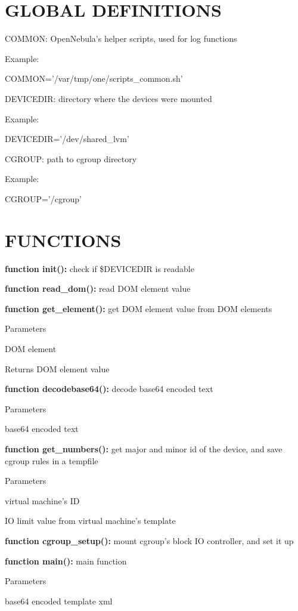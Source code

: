\hypertarget{doc_def}{}\section{GLOBAL DEFINITIONS}\label{doc_def}
COMMON: OpenNebula's helper scripts, used for log functions \par


Example: \par
 
\begin{DoxyCode}
 COMMON='/var/tmp/one/scripts_common.sh'
\end{DoxyCode}
 DEVICEDIR: directory where the devices were mounted \par


Example: \par
 
\begin{DoxyCode}
 DEVICEDIR='/dev/shared_lvm'
\end{DoxyCode}
 CGROUP: path to cgroup directory \par


Example: \par
 
\begin{DoxyCode}
 CGROUP='/cgroup'
\end{DoxyCode}
\hypertarget{doc_func}{}\section{FUNCTIONS}\label{doc_func}
{\bfseries function init():} check if \$DEVICEDIR is readable \par


{\bfseries function read\_\-dom():} read DOM element value \par


{\bfseries function get\_\-element():} get DOM element value from DOM elements 
\begin{DoxyParams}{Parameters}
\item[\mbox{\tt[in]} {\em entity}]DOM element \end{DoxyParams}
\begin{DoxyReturn}{Returns}
DOM element value
\end{DoxyReturn}
{\bfseries function decodebase64():} decode base64 encoded text 
\begin{DoxyParams}{Parameters}
\item[\mbox{\tt[in]} {\em text}]base64 encoded text\end{DoxyParams}
{\bfseries function get\_\-numbers():} get major and minor id of the device, and save cgroup rules in a tempfile 
\begin{DoxyParams}{Parameters}
\item[\mbox{\tt[in]} {\em id}]virtual machine's ID \item[\mbox{\tt[in]} {\em iolimit}]IO limit value from virtual machine's template\end{DoxyParams}
{\bfseries function cgroup\_\-setup():} mount cgroup's block IO controller, and set it up

{\bfseries function main():} main function 
\begin{DoxyParams}{Parameters}
\item[\mbox{\tt[in]} {\em encoded\_\-template}]base64 encoded template xml \end{DoxyParams}
